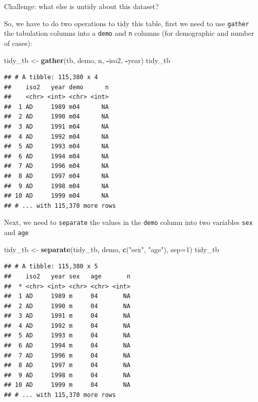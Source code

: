 \documentclass[12pt,]{book}
\newenvironment{Shaded}{\begin{snugshade}}{\end{snugshade}}
\newcommand{\KeywordTok}[1]{\textcolor[rgb]{0.13,0.29,0.53}{\textbf{#1}}}
\newcommand{\DataTypeTok}[1]{\textcolor[rgb]{0.13,0.29,0.53}{#1}}
\newcommand{\DecValTok}[1]{\textcolor[rgb]{0.00,0.00,0.81}{#1}}
\newcommand{\StringTok}[1]{\textcolor[rgb]{0.31,0.60,0.02}{#1}}
\newcommand{\OperatorTok}[1]{\textcolor[rgb]{0.81,0.36,0.00}{\textbf{#1}}}
\newcommand{\NormalTok}[1]{#1}
\theoremstyle{definition}
\theoremstyle{definition}
\theoremstyle{definition}
\theoremstyle{remark}
\begin{document}
Challenge: what else is untidy about this dataset?

So, we have to do two operations to tidy this table, first we need to
use \texttt{gather} the tabulation columns into a \texttt{demo} and
\texttt{n} columns (for demographic and number of cases):

\begin{Shaded}
\begin{Highlighting}[]
\NormalTok{tidy_tb <-}\StringTok{ }\KeywordTok{gather}\NormalTok{(tb, demo, n, }\OperatorTok{-}\NormalTok{iso2, }\OperatorTok{-}\NormalTok{year)}
\NormalTok{tidy_tb}
\end{Highlighting}
\end{Shaded}

\begin{verbatim}
## # A tibble: 115,380 x 4
##    iso2   year demo      n
##    <chr> <int> <chr> <int>
##  1 AD     1989 m04      NA
##  2 AD     1990 m04      NA
##  3 AD     1991 m04      NA
##  4 AD     1992 m04      NA
##  5 AD     1993 m04      NA
##  6 AD     1994 m04      NA
##  7 AD     1996 m04      NA
##  8 AD     1997 m04      NA
##  9 AD     1998 m04      NA
## 10 AD     1999 m04      NA
## # ... with 115,370 more rows
\end{verbatim}

Next, we need to \texttt{separate} the values in the \texttt{demo}
column into two variables \texttt{sex} and \texttt{age}

\begin{Shaded}
\begin{Highlighting}[]
\NormalTok{tidy_tb <-}\StringTok{ }\KeywordTok{separate}\NormalTok{(tidy_tb, demo, }\KeywordTok{c}\NormalTok{(}\StringTok{"sex"}\NormalTok{, }\StringTok{"age"}\NormalTok{), }\DataTypeTok{sep=}\DecValTok{1}\NormalTok{)}
\NormalTok{tidy_tb}
\end{Highlighting}
\end{Shaded}

\begin{verbatim}
## # A tibble: 115,380 x 5
##    iso2   year sex   age       n
##  * <chr> <int> <chr> <chr> <int>
##  1 AD     1989 m     04       NA
##  2 AD     1990 m     04       NA
##  3 AD     1991 m     04       NA
##  4 AD     1992 m     04       NA
##  5 AD     1993 m     04       NA
##  6 AD     1994 m     04       NA
##  7 AD     1996 m     04       NA
##  8 AD     1997 m     04       NA
##  9 AD     1998 m     04       NA
## 10 AD     1999 m     04       NA
## # ... with 115,370 more rows
\end{verbatim}
\end{document}
